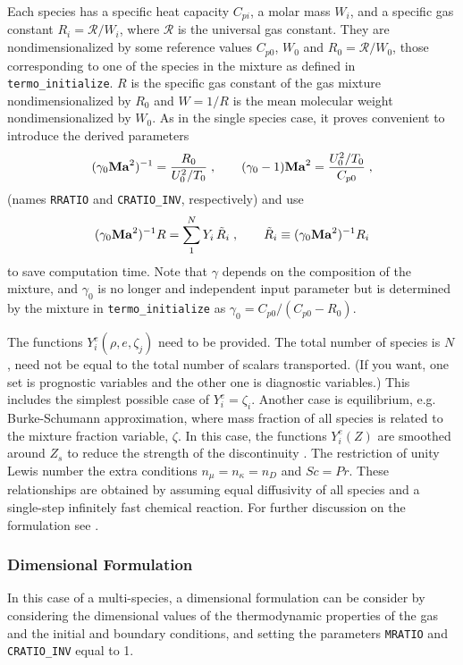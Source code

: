 Each species has a specific heat capacity $C_{pi}$, a molar mass $W_i$, and a specific gas constant $R_i=\mathcal{R}/W_i$, where  $\mathcal{R}$ is the universal gas constant. They are nondimensionalized by some reference values $C_{p0}$, $W_0$ and $R_0=\mathcal{R}/W_0$, those corresponding to one of the species in the mixture as defined in \texttt{termo\_initialize}. $R$ is the specific gas constant of the gas mixture nondimensionalized by $R_0$ and $W=1/R$ is the mean molecular weight nondimensionalized by $W_0$. As in the single species case, it proves convenient to introduce the derived parameters
\begin{equation}
    (\gamma_0\mathrm{\bf Ma}^2)^{-1}=\frac{R_0}{U^2_0/T_0}\;,\qquad (\gamma_0-1)\mathrm{\bf Ma}^2 =\frac{U_0^2/T_0}{C_{p0}} \;,
\end{equation}
(names \texttt{RRATIO} and \texttt{CRATIO\_INV}, respectively) and use 
\begin{equation}
    (\gamma_0\mathrm{\bf Ma}^2)^{-1}R=\sum_1^NY_i\,\tilde{R}_i\;,\qquad\tilde{R}_i\equiv (\gamma_0\mathrm{\bf Ma}^2)^{-1}R_i
\end{equation}
to save computation time. Note that $\gamma$ depends on the composition of the mixture, and $\gamma_0$ is no longer and independent input parameter but is determined by the mixture in \texttt{termo\_initialize} as $\gamma_0=C_{p0}/(C_{p0}-R_0)$.

The functions $Y_i^e(\rho,e,\zeta_j)$ need to be provided. The total number of species is $N$, need not be equal to the total number of scalars transported. (If you want, one set is prognostic variables and the other one is diagnostic variables.) This includes the simplest possible case of $Y_i^e = \zeta_i$. Another case is equilibrium, e.g. Burke-Schumann approximation, where mass fraction of all species is related to the mixture fraction variable, $\zeta$.  In this case, the functions $Y_i^e(Z)$ are smoothed around $Z_s$ to reduce the strength of the discontinuity \citep{Higuera:1994}. The restriction of unity Lewis number the extra conditions $n_\mu=n_\kappa=n_D$ and $Sc=Pr$. These relationships are obtained by assuming equal diffusivity of all species and a single-step infinitely fast chemical reaction.  For further discussion on the formulation see \cite{Williams:1985}.

\subsubsection{Dimensional Formulation}

In this case of a multi-species, a dimensional formulation can be consider by considering the dimensional values of the thermodynamic properties of the gas and the initial and boundary conditions, and setting the parameters \texttt{MRATIO} and \texttt{CRATIO\_INV} equal to 1.

